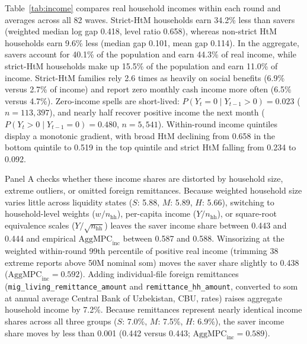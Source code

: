 \documentclass[11pt]{article}
\begin{document}
Table~\ref{tab:income} compares real household incomes within each round and averages across all 82 waves. Strict-HtM households earn 34.2\% less than savers (weighted median log gap 0.418, level ratio 0.658), whereas non-strict HtM households earn 9.6\% less (median gap 0.101, mean gap 0.114). In the aggregate, savers account for 40.1\% of the population and earn 44.3\% of real income, while strict-HtM households make up 15.5\% of the population and earn 11.0\% of income. Strict-HtM families rely 2.6 times as heavily on social benefits (6.9\% versus 2.7\% of income) and report zero monthly cash income more often (6.5\% versus 4.7\%). Zero-income spells are short-lived: $P(Y_t = 0 \mid Y_{t-1} > 0) = 0.023$ ($n = 113{,}397$), and nearly half recover positive income the next month ($P(Y_t > 0 \mid Y_{t-1} = 0) = 0.480$, $n = 5{,}541$). Within-round income quintiles display a monotonic gradient, with broad HtM declining from 0.658 in the bottom quintile to 0.519 in the top quintile and strict HtM falling from 0.234 to 0.092.

Panel A checks whether these income shares are distorted by household size, extreme outliers, or omitted foreign remittances. Because weighted household size varies little across liquidity states ($S$: 5.88, $M$: 5.89, $H$: 5.66), switching to household-level weights ($w / n_{\text{hh}}$), per-capita income ($Y / n_{\text{hh}}$), or square-root equivalence scales ($Y / \sqrt{n_{\text{hh}}}$) leaves the saver income share between 0.443 and 0.444 and empirical $\text{AggMPC}_{\text{inc}}$ between 0.587 and 0.588. Winsorizing at the weighted within-round 99th percentile of positive real income (trimming 38 extreme reports above 50M nominal som) moves the saver share slightly to 0.438 ($\text{AggMPC}_{\text{inc}} = 0.592$). Adding individual-file foreign remittances (\texttt{mig\_living\_remittance\_amount} and \texttt{remittance\_hh\_amount}, converted to som at annual average Central Bank of Uzbekistan, CBU, rates) raises aggregate household income by 7.2\%. Because remittances represent nearly identical income shares across all three groups ($S$: 7.0\%, $M$: 7.5\%, $H$: 6.9\%), the saver income share moves by less than 0.001 (0.442 versus 0.443; $\text{AggMPC}_{\text{inc}} = 0.589$).
\end{document}
